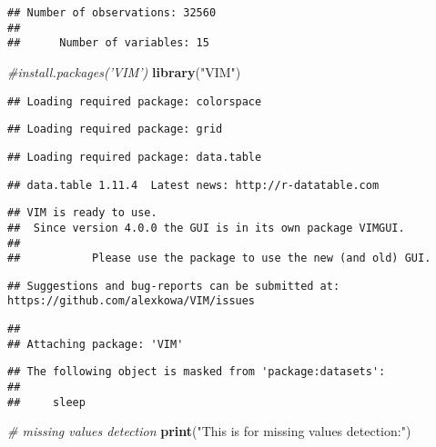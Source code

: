 \documentclass[]{article}
\newenvironment{Shaded}{\begin{snugshade}}{\end{snugshade}}
\newcommand{\KeywordTok}[1]{\textcolor[rgb]{0.13,0.29,0.53}{\textbf{#1}}}
\newcommand{\StringTok}[1]{\textcolor[rgb]{0.31,0.60,0.02}{#1}}
\newcommand{\CommentTok}[1]{\textcolor[rgb]{0.56,0.35,0.01}{\textit{#1}}}
\newcommand{\NormalTok}[1]{#1}
\begin{document}
\begin{verbatim}
## Number of observations: 32560 
## 
##      Number of variables: 15
\end{verbatim}

\begin{Shaded}
\begin{Highlighting}[]
\CommentTok{#install.packages('VIM')}
\KeywordTok{library}\NormalTok{(}\StringTok{"VIM"}\NormalTok{)}
\end{Highlighting}
\end{Shaded}

\begin{verbatim}
## Loading required package: colorspace
\end{verbatim}

\begin{verbatim}
## Loading required package: grid
\end{verbatim}

\begin{verbatim}
## Loading required package: data.table
\end{verbatim}

\begin{verbatim}
## data.table 1.11.4  Latest news: http://r-datatable.com
\end{verbatim}

\begin{verbatim}
## VIM is ready to use. 
##  Since version 4.0.0 the GUI is in its own package VIMGUI.
## 
##           Please use the package to use the new (and old) GUI.
\end{verbatim}

\begin{verbatim}
## Suggestions and bug-reports can be submitted at: https://github.com/alexkowa/VIM/issues
\end{verbatim}

\begin{verbatim}
## 
## Attaching package: 'VIM'
\end{verbatim}

\begin{verbatim}
## The following object is masked from 'package:datasets':
## 
##     sleep
\end{verbatim}

\begin{Shaded}
\begin{Highlighting}[]
\CommentTok{# missing values detection }
\KeywordTok{print}\NormalTok{(}\StringTok{"This is for missing values detection:"}\NormalTok{)}
\end{Highlighting}
\end{Shaded}
\end{document}
